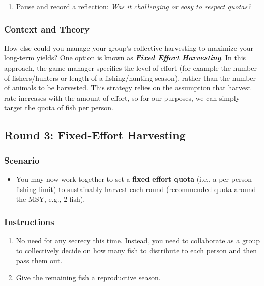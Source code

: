 \documentclass[]{tufte-handout}
\providecommand{\tightlist}{%
  \setlength{\itemsep}{0pt}\setlength{\parskip}{0pt}}
\begin{document}
\begin{enumerate}
\def\labelenumi{\arabic{enumi}.}
\setcounter{enumi}{4}
\tightlist
\item
  Pause and record a reflection: \emph{Was it challenging or easy to
  respect quotas?}
\end{enumerate}

\subsubsection{Context and Theory}\label{context-and-theory-1}

How else could you manage your group's collective harvesting to maximize
your long-term yields? One option is known as \textbf{\emph{Fixed Effort
Harvesting}}. In this approach, the game manager specifies the level of
effort (for example the number of fishers/hunters or length of a
fishing/hunting season), rather than the number of animals to be
harvested. This strategy relies on the assumption that harvest rate
increases with the amount of effort, so for our purposes, we can simply
target the quota of fish per person.

\subsection{Round 3: Fixed-Effort
Harvesting}\label{round-3-fixed-effort-harvesting}

\subsubsection{Scenario}\label{scenario-2}

\begin{itemize}
\tightlist
\item
  You may now work together to set a \textbf{fixed effort quota} (i.e.,
  a per-person fishing limit) to sustainably harvest each round
  (recommended quota around the MSY, e.g., 2 fish).
\end{itemize}

\subsubsection{Instructions}\label{instructions-2}

\begin{enumerate}
\def\labelenumi{\arabic{enumi}.}
\tightlist
\item
  No need for any secrecy this time. Instead, you need to collaborate as
  a group to collectively decide on how many fish to distribute to each
  person and then pass them out.
\item
  Give the remaining fish a reproductive season.
\end{enumerate}
\end{document}
